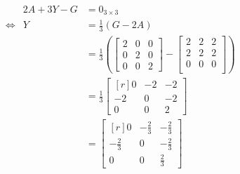 
\begin{align*}
	&&2A + 3Y - G &= 0_{3 \times 3} \\
	&\iff& Y &= \frac{1}{3}\left(G - 2A\right)\\
	&&&=
	\frac{1}{3}
	\left(
	\begin{bmatrix*}
		2 & 0 & 0\\
		0 & 2 & 0\\
		0 & 0 & 2
	\end{bmatrix*}
	-
	\begin{bmatrix*}
		2 & 2 & 2\\
		2 & 2 & 2\\
		0 & 0 & 0\\
	\end{bmatrix*}\right)\\
	&&&=
	\frac{1}{3}
	\begin{bmatrix*}[r]
		0            & -2 & -2\\
		-2           & 0  & -2\\
		0            & 0  & 2
	\end{bmatrix*}\\
	&&&=
	\begin{bmatrix*}[r]
		0            & -\frac{2}{3} & -\frac{2}{3}\\
		-\frac{2}{3} & 0            & -\frac{2}{3}\\
		0            & 0            & \frac{2}{3}
	\end{bmatrix*}
\end{align*}

\clearpage


